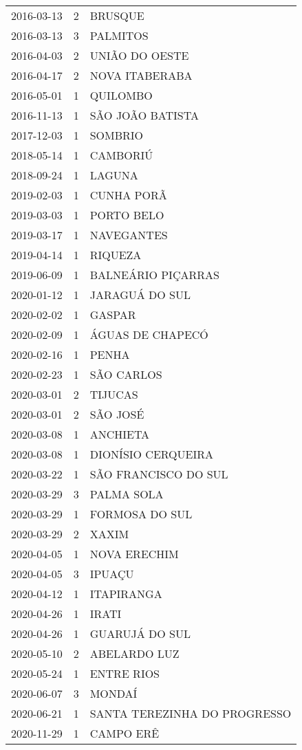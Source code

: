 \documentclass[
	12pt,				%
	openright,			%
	oneside,			%
	a4paper,			%
	english,			%
	french,				%
	spanish,			%
	brazil				%
	dvipsnames, table]{abntex2}
\begin{document}
\begin{longtable}[htbp]{ccl}
2016-03-13 & 2 & BRUSQUE \\
2016-03-13 & 3 & PALMITOS \\
2016-04-03 & 2 & UNIÃO DO OESTE \\
2016-04-17 & 2 & NOVA ITABERABA \\
2016-05-01 & 1 & QUILOMBO \\
2016-11-13 & 1 & SÃO JOÃO BATISTA \\
2017-12-03 & 1 & SOMBRIO \\
2018-05-14 & 1 & CAMBORIÚ \\
2018-09-24 & 1 & LAGUNA \\
2019-02-03 & 1 & CUNHA PORÃ \\
2019-03-03 & 1 & PORTO BELO \\
2019-03-17 & 1 & NAVEGANTES \\
2019-04-14 & 1 & RIQUEZA \\
2019-06-09 & 1 & BALNEÁRIO PIÇARRAS \\
2020-01-12 & 1 & JARAGUÁ DO SUL \\
2020-02-02 & 1 & GASPAR \\
2020-02-09 & 1 & ÁGUAS DE CHAPECÓ \\
2020-02-16 & 1 & PENHA \\
2020-02-23 & 1 & SÃO CARLOS \\
2020-03-01 & 2 & TIJUCAS \\
2020-03-01 & 2 & SÃO JOSÉ \\
2020-03-08 & 1 & ANCHIETA \\
2020-03-08 & 1 & DIONÍSIO CERQUEIRA \\
2020-03-22 & 1 & SÃO FRANCISCO DO SUL \\
2020-03-29 & 3 & PALMA SOLA \\
2020-03-29 & 1 & FORMOSA DO SUL \\
2020-03-29 & 2 & XAXIM \\
2020-04-05 & 1 & NOVA ERECHIM \\
2020-04-05 & 3 & IPUAÇU \\
2020-04-12 & 1 & ITAPIRANGA \\
2020-04-26 & 1 & IRATI \\
2020-04-26 & 1 & GUARUJÁ DO SUL \\
2020-05-10 & 2 & ABELARDO LUZ \\
2020-05-24 & 1 & ENTRE RIOS \\
2020-06-07 & 3 & MONDAÍ \\
2020-06-21 & 1 & SANTA TEREZINHA DO PROGRESSO \\
2020-11-29 & 1 & CAMPO ERÊ \\

\end{longtable}
\end{document}
